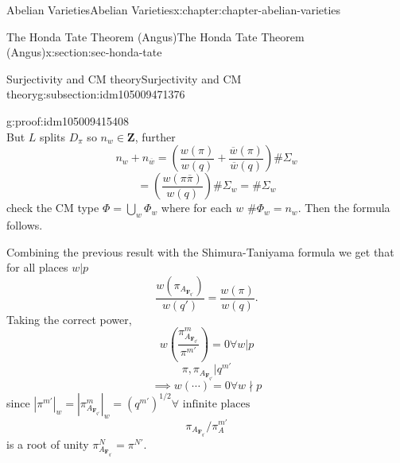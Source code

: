 \documentclass[oneside,10pt,]{book}
\numberwithin{equation}{section}
\newcommand{\ZZ}{\mathbf{Z}}
\newcommand{\FF}{\mathbf{F}}
\begin{document}
\begin{chapterptx}{Abelian Varieties}{}{Abelian Varieties}{}{}{x:chapter:chapter-abelian-varieties}
\begin{sectionptx}{The Honda Tate Theorem (Angus)}{}{The Honda Tate Theorem (Angus)}{}{}{x:section:sec-honda-tate}
\begin{subsectionptx}{Surjectivity and CM theory}{}{Surjectivity and CM theory}{}{}{g:subsection:idm105009471376}
\begin{proofptx}{}{g:proof:idm105009415408}
\begin{equation*}
\end{equation*}
But \(L\) splits \(D_\pi\) so \(n_w \in \ZZ\), further%
\begin{equation*}
n_w + n_{\overline w} = \left( \frac{w(\pi)}{w(q)}  + \frac{\overline w(\pi)}{\overline w(q)} \right) \#\Sigma_w
\end{equation*}
%
\begin{equation*}
= \left( \frac{w(\pi\overline \pi)}{w(q)} \right) \#\Sigma_w = \#\Sigma_w
\end{equation*}
check the CM type \(\Phi = \bigcup_w \Phi_w\) where for each \(w\) \(\# \Phi_w = n_w\). Then the formula follows.%
\end{proofptx}
Combining the previous result with the Shimura-Taniyama formula we get that for all places \(w|p\)%
\begin{equation*}
\frac{w(\pi_{A_{\FF_{q'}}})}{w(q')} = \frac{w(\pi)}{w(q)}\text{.}
\end{equation*}
Taking the correct power,%
\begin{equation*}
w\left( \frac {\pi^m_{A_{\FF_{q'}}}}{\pi^{m'}}\right) = 0 \forall w|p
\end{equation*}
%
\begin{equation*}
\pi,\pi_{A_{\FF_{q'}}}|q^{m'}
\end{equation*}
%
\begin{equation*}
\implies w(\cdots) = 0 \forall w \nmid p
\end{equation*}
since \(|\pi^{m'}|_w = |\pi_{A_{\FF_{q'}}}^m|_w = (q^{m'})^{1/2} \forall \text{ infinite places}\)%
\begin{equation*}
\pi_{A_{\FF_{q'}}}/ \pi_A^{m'}
\end{equation*}
is a root of unity \(\pi^N_{A_{\FF_{q'}}} = \pi^{N'}\).%
\end{subsectionptx}
\end{sectionptx}
\end{chapterptx}
%
%
\typeout{************************************************}
\typeout{************************************************}
%
\end{document}
